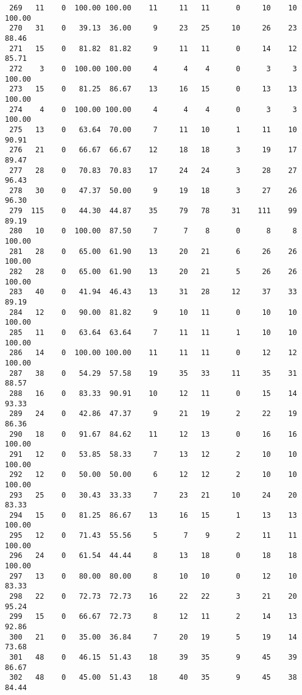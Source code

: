 \begin{verbatim}
 269   11    0  100.00 100.00    11     11   11      0     10    10   100.00
 270   31    0   39.13  36.00     9     23   25     10     26    23    88.46
 271   15    0   81.82  81.82     9     11   11      0     14    12    85.71
 272    3    0  100.00 100.00     4      4    4      0      3     3   100.00
 273   15    0   81.25  86.67    13     16   15      0     13    13   100.00
 274    4    0  100.00 100.00     4      4    4      0      3     3   100.00
 275   13    0   63.64  70.00     7     11   10      1     11    10    90.91
 276   21    0   66.67  66.67    12     18   18      3     19    17    89.47
 277   28    0   70.83  70.83    17     24   24      3     28    27    96.43
 278   30    0   47.37  50.00     9     19   18      3     27    26    96.30
 279  115    0   44.30  44.87    35     79   78     31    111    99    89.19
 280   10    0  100.00  87.50     7      7    8      0      8     8   100.00
 281   28    0   65.00  61.90    13     20   21      6     26    26   100.00
 282   28    0   65.00  61.90    13     20   21      5     26    26   100.00
 283   40    0   41.94  46.43    13     31   28     12     37    33    89.19
 284   12    0   90.00  81.82     9     10   11      0     10    10   100.00
 285   11    0   63.64  63.64     7     11   11      1     10    10   100.00
 286   14    0  100.00 100.00    11     11   11      0     12    12   100.00
 287   38    0   54.29  57.58    19     35   33     11     35    31    88.57
 288   16    0   83.33  90.91    10     12   11      0     15    14    93.33
 289   24    0   42.86  47.37     9     21   19      2     22    19    86.36
 290   18    0   91.67  84.62    11     12   13      0     16    16   100.00
 291   12    0   53.85  58.33     7     13   12      2     10    10   100.00
 292   12    0   50.00  50.00     6     12   12      2     10    10   100.00
 293   25    0   30.43  33.33     7     23   21     10     24    20    83.33
 294   15    0   81.25  86.67    13     16   15      1     13    13   100.00
 295   12    0   71.43  55.56     5      7    9      2     11    11   100.00
 296   24    0   61.54  44.44     8     13   18      0     18    18   100.00
 297   13    0   80.00  80.00     8     10   10      0     12    10    83.33
 298   22    0   72.73  72.73    16     22   22      3     21    20    95.24
 299   15    0   66.67  72.73     8     12   11      2     14    13    92.86
 300   21    0   35.00  36.84     7     20   19      5     19    14    73.68
 301   48    0   46.15  51.43    18     39   35      9     45    39    86.67
 302   48    0   45.00  51.43    18     40   35      9     45    38    84.44

\end{verbatim}
